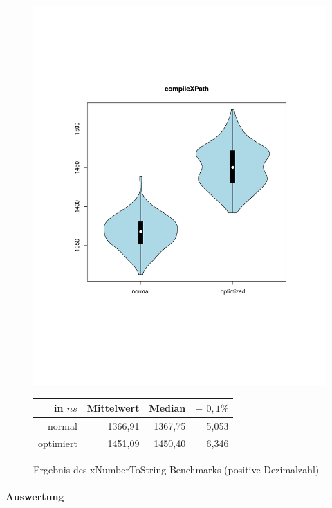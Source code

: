 \begin{figure}[H]
{		\includegraphics[trim=20mm 60mm 0mm 50mm,scale=0.50]{pictures/vioplot_compileXPath.pdf}
	}

	\begin{table}[H]
	\centering
		\begin{tabular}{|r|r|r|r|}
			\hline
		   	in $ns$ 	  & Mittelwert & Median & \bf{$\pm$ $0,1\%$} \\
		 	\hline
		 	\hline
		  	normal 	  & 1366,91 & 1367,75 & 5,053 \\
		 	optimiert & 1451,09 & 1450,40 & 6,346 \\ 
		  	\hline
		  	
		\end{tabular}
	\end{table}

	\caption{Ergebnis des xNumberToString Benchmarks (positive Dezimalzahl)}\label{bp:compile}
\end{figure}

\paragraph{Auswertung}

